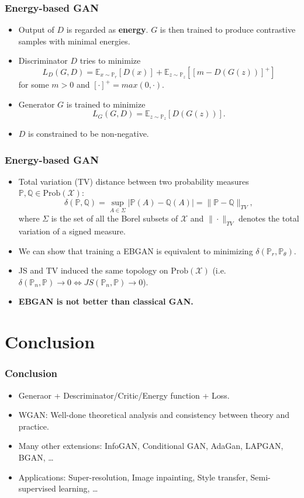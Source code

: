 \begin{frame}
  \frametitle{Energy-based GAN}
  \begin{itemize}
    \item Output of $D$ is regarded as \textbf{energy}. $G$ is then trained
      to produce contrastive samples with minimal energies.
    \item Discriminator $D$ tries to minimize
      \[
        L_D(G, D) = \mathbb{E}_{x\sim\mathbb{P}_r}[D(x)]
        + \mathbb{E}_{z\sim\mathbb{P}_z}[[m - D(G(z))]^+]
      \]
      for some $m > 0$ and $[\cdot]^+=max(0, \cdot)$.
    \item Generator $G$ is trained to minimize
      \[ L_G(G, D) = \mathbb{E}_{z\sim\mathbb{P}_z}[D(G(z))]. \]
    \item $D$ is constrained to be non-negative.
  \end{itemize}
\end{frame}

\begin{frame}
  \frametitle{Energy-based GAN}
  \begin{itemize}
    \item Total variation (TV) distance between two probability measures
      $\mathbb{P}, \mathbb{Q} \in \mathrm{Prob}(\mathcal{X})$:
      \[
        \delta(\mathbb{P}, \mathbb{Q})
        = \sup_{A\in\Sigma} |\mathbb{P}(A)-\mathbb{Q}(A)|
        = \|\mathbb{P} - \mathbb{Q}\|_{TV},
      \]
      where $\Sigma$ is the set of all the Borel subsets of $\mathcal{X}$
      and $\|\cdot\|_{TV}$ denotes the total variation of a signed measure.
    \item We can show that training a EBGAN is equivalent to minimizing
      $\delta(\mathbb{P}_r, \mathbb{P}_{\theta})$.
    \item JS and TV induced the same topology on $\mathrm{Prob}(\mathcal{X})$
      (i.e.\ $\delta(\mathbb{P}_n, \mathbb{P})\rightarrow 0 \Leftrightarrow
        JS(\mathbb{P}_n, \mathbb{P})\rightarrow 0$).
    \item \textbf{EBGAN is not better than classical GAN.}
  \end{itemize}
\end{frame}

\section{Conclusion}

\begin{frame}
  \frametitle{Conclusion}
  \begin{itemize}
    \item Generaor + Descriminator/Critic/Energy function + Loss.
    \item WGAN: Well-done theoretical analysis and consistency
      between theory and practice.
    \item Many other extensions: InfoGAN, Conditional GAN, AdaGan,
      LAPGAN, BGAN, \ldots
    \item Applications: Super-resolution, Image inpainting, Style transfer,
      Semi-supervised learning, \ldots
  \end{itemize}
\end{frame}

